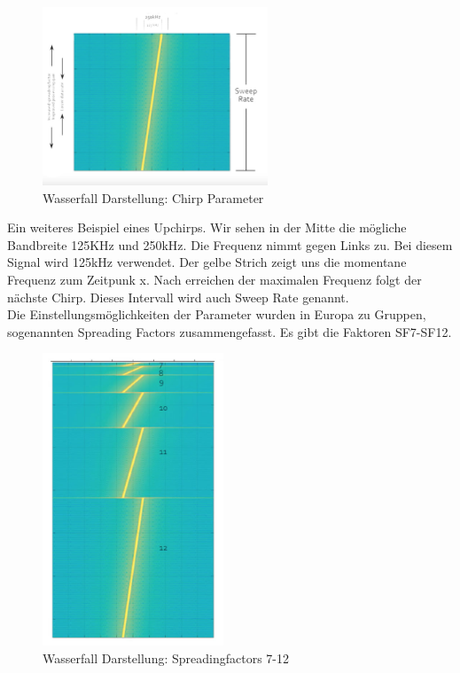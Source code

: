 \documentclass[11pt,english,german]{report}
\theoremstyle{definition}
\begin{document}
\begin{figure}[H]
	\centering
	\includegraphics[width=0.6\textwidth]{img/lora/chirp.jpg}
	\caption[Wasserfall Darstellung: Chirp Parameter]
	{Wasserfall Darstellung: Chirp Parameter}
\end{figure}

\noindent
Ein weiteres Beispiel eines Upchirps. Wir sehen in der Mitte die mögliche Bandbreite 125KHz und 250kHz. Die Frequenz nimmt gegen Links zu. Bei diesem Signal wird 125kHz verwendet. Der gelbe Strich zeigt uns die momentane Frequenz zum Zeitpunk x. Nach erreichen der maximalen Frequenz folgt der nächste Chirp. Dieses Intervall wird auch Sweep Rate genannt.\\[0.3cm]
Die Einstellungsmöglichkeiten der Parameter wurden in Europa zu Gruppen, sogenannten Spreading Factors zusammengefasst. Es gibt die Faktoren SF7-SF12.

\begin{figure}[H]
	\centering
	\includegraphics[width=0.48\textwidth]{img/lora/spreadingfactors.jpg}
	\caption[Wasserfall Darstellung: Spreadingfactors 7-12]
	{Wasserfall Darstellung: Spreadingfactors 7-12}
\end{figure}
\end{document}
